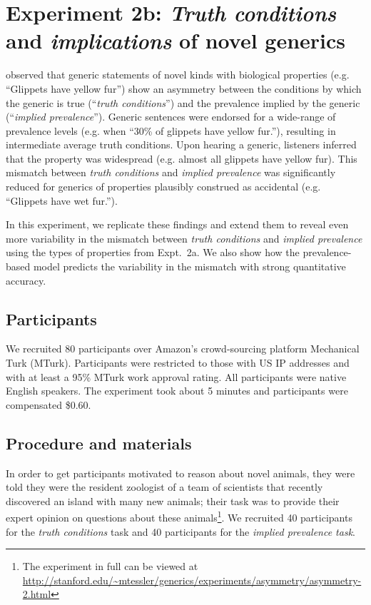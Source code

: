 \documentclass[10pt,letterpaper]{article}
\begin{document}
\section{Experiment 2b: \emph{Truth conditions} and \emph{implications} of novel generics}

\citeauthor{Cimpian2010} observed that generic statements of novel kinds with biological properties (e.g. ``Glippets have yellow fur'') show an asymmetry between the conditions by which the generic is true (``\emph{truth conditions}'') and the prevalence implied by the generic (``\emph{implied prevalence}''). 
Generic sentences were endorsed for a wide-range of prevalence levels (e.g. when ``30\% of glippets have yellow fur.''), resulting in intermediate average truth conditions. 
Upon hearing a generic, listeners inferred that the property was widespread (e.g. almost all glippets have yellow fur).
This mismatch between \emph{truth conditions} and \emph{implied prevalence} was significantly reduced for generics of properties plausibly construed as accidental (e.g. ``Glippets have wet fur.'').

In this experiment,  we replicate these findings and extend them to reveal even more variability in the mismatch between \emph{truth conditions} and \emph{implied prevalence} using the types of properties from Expt.~2a.
We also show how the prevalence-based model predicts the variability in the mismatch with strong quantitative accuracy.


\subsection{Participants}

We recruited 80 participants over Amazon's crowd-sourcing platform Mechanical Turk (MTurk).  
Participants were restricted to those with US IP addresses and with at least a 95\% MTurk work approval rating. 
All participants were native English speakers. 
The experiment took about 5 minutes and participants were compensated \$0.60.

\subsection{Procedure and materials}

In order to get participants motivated to reason about novel animals, they were told they were the resident zoologist of a team of scientists that recently discovered an island with many new animals; their task was to provide their expert opinion on questions about these animals\footnote{The experiment in full can be viewed at \url{http://stanford.edu/~mtessler/generics/experiments/asymmetry/asymmetry-2.html}}. 
We recruited 40 participants for the \emph{truth conditions} task and 40 participants for the \emph{implied prevalence task}. 
\end{document}

